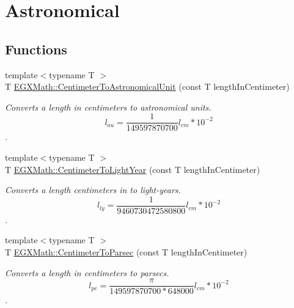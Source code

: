 \hypertarget{group___e_g_x_math-_conversions-_length_conversions-_centimeter-_astronomical}{}\section{Astronomical}
\label{group___e_g_x_math-_conversions-_length_conversions-_centimeter-_astronomical}
\subsection*{Functions}
\begin{DoxyCompactItemize}
\item 
{\footnotesize template$<$typename T $>$ }\\T \mbox{\hyperlink{group___e_g_x_math-_conversions-_length_conversions-_centimeter-_astronomical_gaa8152adbb5be9ad80f2495646bbf316d}{E\+G\+X\+Math\+::\+Centimeter\+To\+Astronomical\+Unit}} (const T length\+In\+Centimeter)
\begin{DoxyCompactList}\small\item\em Converts a length in centimeters to astronomical units. \[ l_{au}= \frac{1}{149597870700} l_{cm} * 10^{-2} \]. \end{DoxyCompactList}\item 
{\footnotesize template$<$typename T $>$ }\\T \mbox{\hyperlink{group___e_g_x_math-_conversions-_length_conversions-_centimeter-_astronomical_ga99b5eb487ffbb3d89497999b562ea77e}{E\+G\+X\+Math\+::\+Centimeter\+To\+Light\+Year}} (const T length\+In\+Centimeter)
\begin{DoxyCompactList}\small\item\em Converts a length centimeters in to light-\/years. \[ l_{ly}= \frac{1}{9460730472580800} l_{cm} * 10^{-2} \]. \end{DoxyCompactList}\item 
{\footnotesize template$<$typename T $>$ }\\T \mbox{\hyperlink{group___e_g_x_math-_conversions-_length_conversions-_centimeter-_astronomical_ga9e28cd6f9d5da2330cd5bf17af20cc8f}{E\+G\+X\+Math\+::\+Centimeter\+To\+Parsec}} (const T length\+In\+Centimeter)
\begin{DoxyCompactList}\small\item\em Converts a length in centimeters to parsecs. \[ l_{pc}=\frac{\pi}{149597870700 * 648000} l_{cm} * 10^{-2} \]. \end{DoxyCompactList}\end{DoxyCompactItemize}


